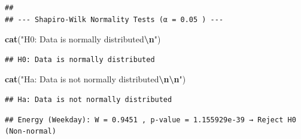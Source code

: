 \documentclass[
  12pt,
]{article}
\newenvironment{Shaded}{\begin{snugshade}}{\end{snugshade}}
\newcommand{\AttributeTok}[1]{\textcolor[rgb]{0.13,0.29,0.53}{#1}}
\newcommand{\ConstantTok}[1]{\textcolor[rgb]{0.56,0.35,0.01}{#1}}
\newcommand{\DecValTok}[1]{\textcolor[rgb]{0.00,0.00,0.81}{#1}}
\newcommand{\FunctionTok}[1]{\textcolor[rgb]{0.13,0.29,0.53}{\textbf{#1}}}
\newcommand{\NormalTok}[1]{#1}
\newcommand{\SpecialCharTok}[1]{\textcolor[rgb]{0.81,0.36,0.00}{\textbf{#1}}}
\newcommand{\StringTok}[1]{\textcolor[rgb]{0.31,0.60,0.02}{#1}}
\begin{document}
\begin{verbatim}
## 
## --- Shapiro-Wilk Normality Tests (α = 0.05 ) ---
\end{verbatim}

\begin{Shaded}
\begin{Highlighting}[]
\FunctionTok{cat}\NormalTok{(}\StringTok{"H0: Data is normally distributed}\SpecialCharTok{\textbackslash{}n}\StringTok{"}\NormalTok{)}
\end{Highlighting}
\end{Shaded}

\begin{verbatim}
## H0: Data is normally distributed
\end{verbatim}

\begin{Shaded}
\begin{Highlighting}[]
\FunctionTok{cat}\NormalTok{(}\StringTok{"Ha: Data is not normally distributed}\SpecialCharTok{\textbackslash{}n\textbackslash{}n}\StringTok{"}\NormalTok{)}
\end{Highlighting}
\end{Shaded}

\begin{verbatim}
## Ha: Data is not normally distributed
\end{verbatim}

\begin{Shaded}
\end{Shaded}

\begin{verbatim}
## Energy (Weekday): W = 0.9451 , p-value = 1.155929e-39 → Reject H0 (Non-normal)
\end{verbatim}
\end{document}
